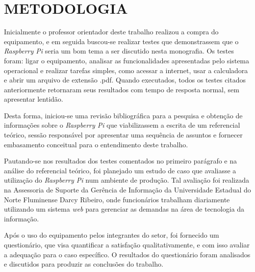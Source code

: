 \chapter{METODOLOGIA}



Inicialmente o professor orientador deste trabalho realizou a compra do equipamento, e em seguida buscou-se realizar testes que demonstrassem que o \textit{Raspberry Pi} seria um bom tema a ser discutido nesta monografia. Os testes foram: ligar o equipamento, analisar as funcionalidades apresentadas pelo sistema operacional e realizar tarefas simples, como acessar a internet, usar a calculadora e abrir um arquivo de extensão .pdf. Quando executados, todos os testes citados anteriormente retornaram seus resultados com tempo de resposta normal, sem apresentar lentidão.

Desta forma, iniciou-se uma revisão bibliográfica para a pesquisa e obtenção de informações sobre o \textit{Raspberry Pi} que viabilizassem a escrita de um referencial teórico, sessão responsável por apresentar uma sequência de assuntos e fornecer embasamento conceitual para o entendimento deste trabalho.

Pautando-se nos resultados dos testes comentados no primeiro parágrafo e na análise do referencial teórico, foi planejado um estudo de caso que avaliasse a utilização do \textit{Raspberry Pi} num ambiente de produção. Tal avaliação foi realizada na Assessoria de Suporte da Gerência de Informação da Universidade Estadual do Norte Fluminense Darcy Ribeiro, onde funcionários trabalham diariamente utilizando um sistema \textit{web} para gerenciar as demandas na área de tecnologia da informação.

Após o uso do equipamento pelos integrantes do setor, foi fornecido um questionário, que visa quantificar a satisfação qualitativamente, e com isso avaliar a adequação para o caso específico. O resultados do questionário foram analisados e discutidos para produzir as conclusões do trabalho.